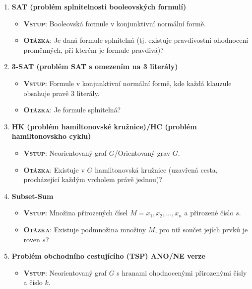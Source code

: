 \begin{enumerate}
\begin{itemize}
          \end{itemize}
    \item \textbf{SAT (problém splnitelnosti booleovských formulí)}
          \begin{itemize}
              \item \textbf{\textsc{Vstup}}: Booleovská formule v konjunktivní normální formě.
              \item \textbf{\textsc{Otázka}}: Je daná formule splnitelná (tj. existuje pravdivostní ohodnocení proměnných, při kterém je formule pravdivá)?
          \end{itemize}
    \item \textbf{3-SAT (problém SAT s omezením na 3 literály)}
          \begin{itemize}
              \item \textbf{\textsc{Vstup}}: Formule v konjunktivní normální formě, kde každá klauzule obsahuje pravě 3 literály.
              \item \textbf{\textsc{Otázka}}: Je formule splnitelná?
          \end{itemize}
    \item \textbf{HK (problém hamiltonovské kružnice)/HC (problém hamiltonovskho cyklu) }
          \begin{itemize}
              \item \textbf{\textsc{Vstup}}: Neorientovaný graf $ G $/Orientovaný grav $ G $.
              \item \textbf{\textsc{Otázka}}: Existuje v $ G $ hamiltonovská kružnice (uzavřená cesta, procházející každým vrcholem právě jednou)?
          \end{itemize}
    \item \textbf{Subset-Sum}
          \begin{itemize}
              \item \textbf{\textsc{Vstup}}: Množina přirozených čísel $ M = {x_1, x_2, \ldots, x_n} $ a přirozené číslo $ s $.
              \item \textbf{\textsc{Otázka}}: Existuje podmnožina množiny $ M $, pro niž součet jejích prvků je roven $ s $?
          \end{itemize}
    \item \textbf{Problém obchodního cestujícího (TSP) ANO/NE verze}
          \begin{itemize}
              \item \textbf{\textsc{Vstup}}: Neorientovaný graf $ G $ s hranami ohodnocenými přirozenými čísly a číslo $ k $.

\end{itemize}
\end{enumerate}
